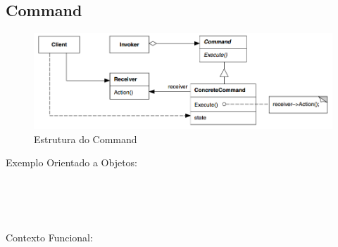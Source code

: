 \subsection{Command}

\begin{figure}[htb]
	\caption{\label{fig_grafico}Estrutura do Command}
	\begin{center}
	    \includegraphics[scale=0.5]{5_padroes-contexto-funcional/5.3_comportamentais/5.3.02_command/diagram.png}
	\end{center}
\end{figure}

Exemplo Orientado a Objetos:

\begin{lstlisting}[caption={Command Orientação a Objetos},label=oocommand]


    
\end{lstlisting}

Contexto Funcional:


\begin{lstlisting}[caption={Command Funcional},label=fpcommand]
    

    
\end{lstlisting}
